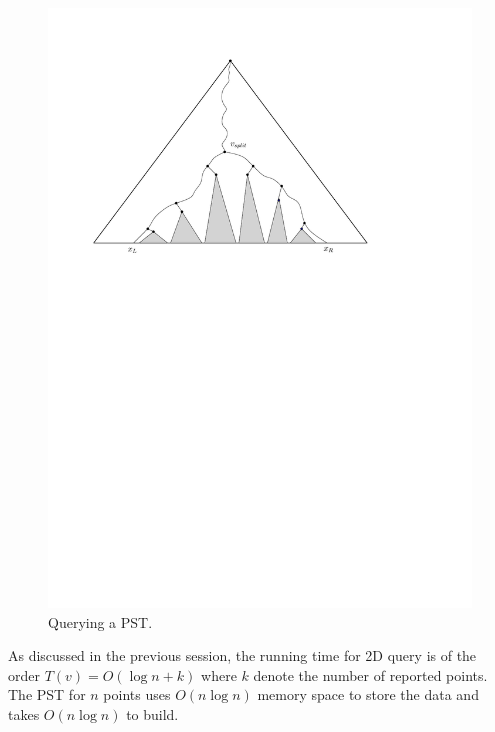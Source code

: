 \begin{figure}[h!]
\begin{center}
  \includegraphics[scale = .5]{ipe/RQ3.pdf}
  \vspace{-0.1in}
  \caption{Querying a PST.}
  \label{fig:PST3}
\end{center}
\end{figure}

As discussed in the previous session, the running time for 2D query is of the order $T(v) = O(\log n+k)$ where $k$ denote the number of reported points. The PST for $n$ points uses $O(n \log n)$ memory space to store the data and takes $O(n \log n)$ to build.